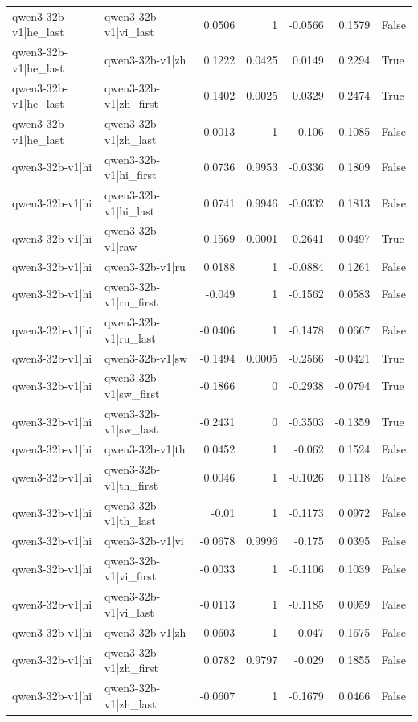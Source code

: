 \begin{table}
\begin{tabular}{l l r r r r l}
qwen3-32b-v1|he_last & qwen3-32b-v1|vi_last & 0.0506 & 1 & -0.0566 & 0.1579 & False \\
qwen3-32b-v1|he_last & qwen3-32b-v1|zh & 0.1222 & 0.0425 & 0.0149 & 0.2294 & True \\
qwen3-32b-v1|he_last & qwen3-32b-v1|zh_first & 0.1402 & 0.0025 & 0.0329 & 0.2474 & True \\
qwen3-32b-v1|he_last & qwen3-32b-v1|zh_last & 0.0013 & 1 & -0.106 & 0.1085 & False \\
qwen3-32b-v1|hi & qwen3-32b-v1|hi_first & 0.0736 & 0.9953 & -0.0336 & 0.1809 & False \\
qwen3-32b-v1|hi & qwen3-32b-v1|hi_last & 0.0741 & 0.9946 & -0.0332 & 0.1813 & False \\
qwen3-32b-v1|hi & qwen3-32b-v1|raw & -0.1569 & 0.0001 & -0.2641 & -0.0497 & True \\
qwen3-32b-v1|hi & qwen3-32b-v1|ru & 0.0188 & 1 & -0.0884 & 0.1261 & False \\
qwen3-32b-v1|hi & qwen3-32b-v1|ru_first & -0.049 & 1 & -0.1562 & 0.0583 & False \\
qwen3-32b-v1|hi & qwen3-32b-v1|ru_last & -0.0406 & 1 & -0.1478 & 0.0667 & False \\
qwen3-32b-v1|hi & qwen3-32b-v1|sw & -0.1494 & 0.0005 & -0.2566 & -0.0421 & True \\
qwen3-32b-v1|hi & qwen3-32b-v1|sw_first & -0.1866 & 0 & -0.2938 & -0.0794 & True \\
qwen3-32b-v1|hi & qwen3-32b-v1|sw_last & -0.2431 & 0 & -0.3503 & -0.1359 & True \\
qwen3-32b-v1|hi & qwen3-32b-v1|th & 0.0452 & 1 & -0.062 & 0.1524 & False \\
qwen3-32b-v1|hi & qwen3-32b-v1|th_first & 0.0046 & 1 & -0.1026 & 0.1118 & False \\
qwen3-32b-v1|hi & qwen3-32b-v1|th_last & -0.01 & 1 & -0.1173 & 0.0972 & False \\
qwen3-32b-v1|hi & qwen3-32b-v1|vi & -0.0678 & 0.9996 & -0.175 & 0.0395 & False \\
qwen3-32b-v1|hi & qwen3-32b-v1|vi_first & -0.0033 & 1 & -0.1106 & 0.1039 & False \\
qwen3-32b-v1|hi & qwen3-32b-v1|vi_last & -0.0113 & 1 & -0.1185 & 0.0959 & False \\
qwen3-32b-v1|hi & qwen3-32b-v1|zh & 0.0603 & 1 & -0.047 & 0.1675 & False \\
qwen3-32b-v1|hi & qwen3-32b-v1|zh_first & 0.0782 & 0.9797 & -0.029 & 0.1855 & False \\
qwen3-32b-v1|hi & qwen3-32b-v1|zh_last & -0.0607 & 1 & -0.1679 & 0.0466 & False \\

\end{tabular}
\end{table}
